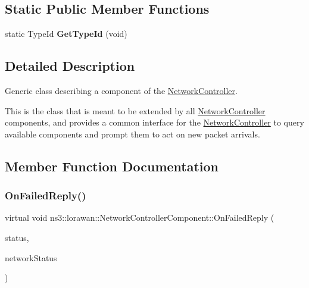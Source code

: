 \subsection*{Static Public Member Functions}
\begin{DoxyCompactItemize}
\item 
\mbox{\label{classns3_1_1lorawan_1_1NetworkControllerComponent_ae56092f06f837c68e92ccf6d068ee30e}} 
static Type\+Id {\bfseries Get\+Type\+Id} (void)
\end{DoxyCompactItemize}


\subsection{Detailed Description}
Generic class describing a component of the \hyperlink{classns3_1_1lorawan_1_1NetworkController}{Network\+Controller}.

This is the class that is meant to be extended by all \hyperlink{classns3_1_1lorawan_1_1NetworkController}{Network\+Controller} components, and provides a common interface for the \hyperlink{classns3_1_1lorawan_1_1NetworkController}{Network\+Controller} to query available components and prompt them to act on new packet arrivals. 

\subsection{Member Function Documentation}
\mbox{\label{classns3_1_1lorawan_1_1NetworkControllerComponent_aaff757f6ece10a8ef24564006c137d72}} 
\subsubsection{\texorpdfstring{On\+Failed\+Reply()}{OnFailedReply()}}
{\footnotesize\ttfamily virtual void ns3\+::lorawan\+::\+Network\+Controller\+Component\+::\+On\+Failed\+Reply (\begin{DoxyParamCaption}\item[{Ptr$<$ \hyperlink{classns3_1_1lorawan_1_1EndDeviceStatus}{End\+Device\+Status} $>$}]{status,  }\item[{Ptr$<$ \hyperlink{classns3_1_1lorawan_1_1NetworkStatus}{Network\+Status} $>$}]{network\+Status }\end{DoxyParamCaption})\hspace{0.3cm}{\ttfamily [pure virtual]}}

